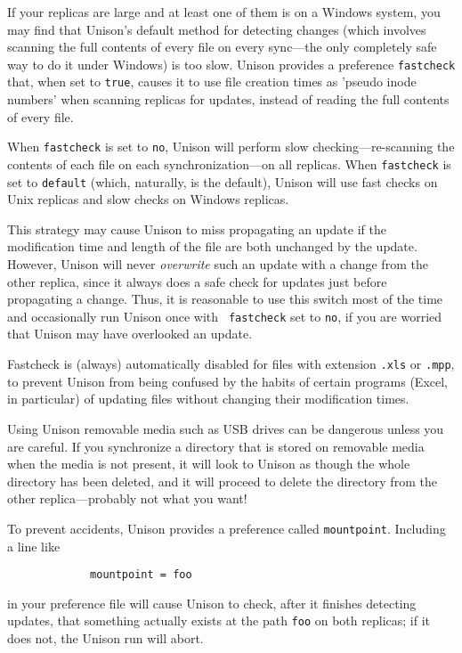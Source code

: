 \documentclass{article}
\begin{document}
If your replicas are large and at least one of them is on a Windows
system, you may find that Unison's default method for detecting changes
(which involves scanning the full contents of every file on every
sync---the only completely safe way to do it under Windows) is too slow.
Unison provides a preference {\tt fastcheck} that, when set to
\verb|true|, causes it to use file creation times as 'pseudo inode
numbers' when scanning replicas for updates, instead of reading the full
contents of every file.

When \verb|fastcheck| is set to \verb|no|,
Unison will perform slow checking---re-scanning the contents of each file
on each synchronization---on all replicas.  When \verb|fastcheck| is set
to \verb|default| (which, naturally, is the default), Unison will use
fast checks on Unix replicas and slow checks on Windows replicas.

This strategy may cause Unison to miss propagating an update if the
 modification time and length of the file are both unchanged
by the update.
However, Unison will never {\em overwrite} such an update with a change
from the other replica, since it always does a safe check for updates
just before propagating a change.  Thus, it is reasonable to use this
switch most of the time and occasionally run Unison once with {\tt
  fastcheck} set to \verb|no|, if you are worried that Unison may have
overlooked an update.

Fastcheck is (always) automatically disabled for files with extension
\verb|.xls| or \verb|.mpp|, to prevent Unison from being confused by the
habits of certain programs (Excel, in particular) of updating files without
changing their modification times.


Using Unison removable media such as USB drives can be dangerous unless you
are careful.  If you synchronize a directory that is stored on removable
media when the media is not present, it will look to Unison as though the
whole directory has been deleted, and it will proceed to delete the
directory from the other replica---probably not what you want!

To prevent accidents, Unison provides a preference called
\verb|mountpoint|.  Including a line like
\begin{verbatim}
             mountpoint = foo
\end{verbatim}
in your preference file will cause Unison to check, after it finishes
detecting updates, that something actually exists at the path
\verb|foo| on both replicas; if it does not, the Unison run will
abort.
\end{document}
